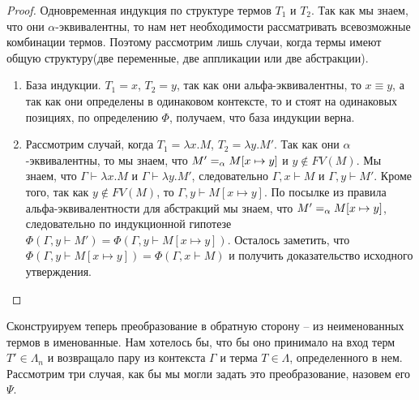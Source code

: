 \begin{proof}
  Одновременная индукция по структуре термов $T_{1}$ и $T_{2}$. Так как мы знаем, что они $\alpha$-эквивалентны, то нам нет необходимости рассматривать всевозможные комбинации термов. Поэтому рассмотрим лишь случаи, когда термы имеют общую структуру(две переменные, две аппликации или две абстракции).

  \begin{enumerate}
    \item База индукции. $T_{1} = x$, $T_{2} = y$, так как они альфа-эквивалентны, то $x \equiv y$, а так как они определены в одинаковом контексте, то и стоят на одинаковых позициях, по определению $\Phi$, получаем, что база индукции верна.
    \item Рассмотрим случай, когда $T_{1} = \lambda x.M$, $T_{2} = \lambda y.M'$. Так как они $\alpha$-эквивалентны, то мы знаем, что $M' =_{\alpha} M[x \mapsto y]$ и $y \notin FV(M)$. Мы знаем, что $\Gamma \vdash \lambda x.M$ и $\Gamma \vdash \lambda y.M'$, следовательно $\Gamma, x \vdash M$ и $\Gamma, y \vdash M'$. Кроме того, так как $y \notin FV(M)$, то $\Gamma, y \vdash M[x \mapsto y]$.
    По посылке из правила альфа-эквивалентности для абстракций мы знаем, что $M' =_{\alpha} M[x \mapsto y]$, следовательно по индукционной гипотезе $\Phi(\Gamma, y \vdash M') = \Phi(\Gamma, y \vdash M[x \mapsto y])$. Осталось заметить, что $\Phi(\Gamma, y \vdash M[x \mapsto y]) = \Phi(\Gamma, x \vdash M)$ и получить доказательство исходного утверждения. \qedhere
  \end{enumerate}
\end{proof}

Сконструируем теперь преобразование в обратную сторону -- из неименованных термов в именованные. Нам хотелось бы, что бы оно принимало на вход терм $T' \in \Lambda_{n}$ и возвращало пару из контекста $\Gamma$ и терма $T \in \Lambda$, определенного в нем. Рассмотрим три случая, как бы мы могли задать это преобразование, назовем его $\Psi$.

